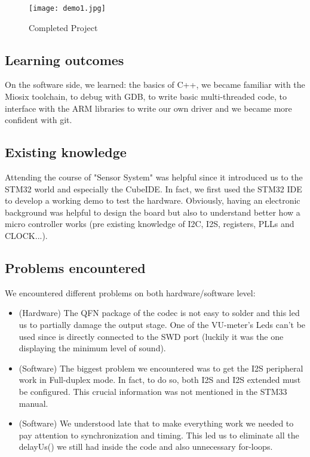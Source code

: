 \documentclass[10pt,a4]{article}
\begin{document}
    \begin{figure}[ht]
        \centering
        \texttt{[image: demo1.jpg]}
        \caption{Completed Project}
    \end{figure}

\subsection{Learning outcomes}
On the software side, we learned: the basics of C++,
we became familiar with the Miosix toolchain,
to debug with GDB,
to write basic multi-threaded code,
to interface with the ARM libraries to write our own driver and we became more confident with git.

\subsection{Existing knowledge}
Attending the course of "Sensor System" was helpful since it introduced us to the STM32 world and especially the CubeIDE. In fact, we first used the STM32 IDE to develop a working demo to test the hardware.
Obviously, having an electronic background was helpful to design the board but also to understand better how a micro controller works (pre existing knowledge of I2C, I2S, registers, PLLs and CLOCK...).

\subsection{Problems encountered}
We encountered different problems on both hardware/software level:

\begin{itemize}
\item (Hardware) The QFN package of the codec is not easy to solder and this led us to partially damage the output stage. One of the VU-meter's Leds can't be used since is directly connected to the SWD port (luckily it was the one displaying the minimum level of sound).
\item (Software) The biggest problem we encountered was to get the I2S peripheral work in Full-duplex mode. In fact, to do so, both I2S and I2S extended must be configured. This crucial information was not mentioned in the STM33 manual.
\item (Software) We understood late that to make everything work we needed to pay attention to synchronization and timing. This led us to eliminate all the delayUs() we still had inside the code and also unnecessary for-loops.
\end{itemize}
\end{document}
